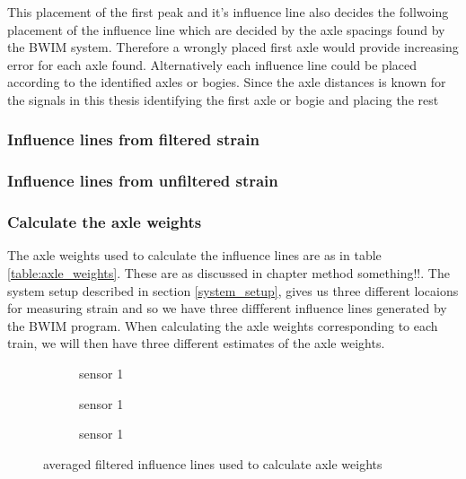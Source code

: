 This placement of the first peak and it's influence line also decides the follwoing placement of the influence line which are decided by the axle spacings found by the BWIM system. Therefore a wrongly placed first axle would provide increasing error for each axle found.
Alternatively each influence line could be placed according to the identified axles or bogies. Since the axle distances is known for the signals in this thesis identifying the first axle or bogie and placing the rest
\subsubsection{Influence lines from filtered strain}

\subsubsection{Influence lines from unfiltered strain}



\subsubsection{Calculate the axle weights}
The axle weights used to calculate the influence lines are as in table \ref{table:axle_weights}. These are as discussed in chapter method something!!. The system setup described in section \ref{system_setup}, gives us three different locaions for measuring strain and so we have three diffferent influence lines generated by the BWIM program. When calculating the axle weights corresponding to each train, we will then have three different estimates of the axle weights.

\begin{figure}[h]
	\begin{subfigure}[t]{0.3\textwidth}
		
		\caption{sensor 1}
		\label{fig:sensor1}
	\end{subfigure}
	\begin{subfigure}[t]{0.3\textwidth}
		
		\caption{sensor 1}
		\label{fig:sensor1}
	\end{subfigure}
	\begin{subfigure}[t]{0.3\textwidth}
		
		\caption{sensor 1}
		\label{fig:sensor1}
	\end{subfigure}
	\caption{averaged filtered influence lines used to calculate axle weights}
	\label{averaged_filtered_infl_lines}
\end{figure}


